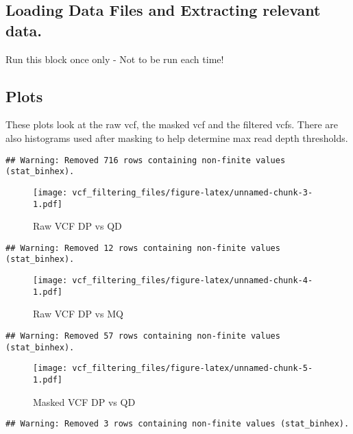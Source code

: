 \documentclass[
]{article}
\begin{document}
\hypertarget{loading-data-files-and-extracting-relevant-data.}{%
\subsection{Loading Data Files and Extracting relevant
data.}\label{loading-data-files-and-extracting-relevant-data.}}

Run this block once only - Not to be run each time!

\hypertarget{plots}{%
\subsection{Plots}\label{plots}}

These plots look at the raw vcf, the masked vcf and the filtered vcfs.
There are also histograms used after masking to help determine max read
depth thresholds.

\begin{verbatim}
## Warning: Removed 716 rows containing non-finite values (stat_binhex).
\end{verbatim}

\begin{figure}
\centering
\texttt{[image: vcf\_filtering\_files/figure-latex/unnamed-chunk-3-1.pdf]}
\caption{Raw VCF DP vs QD}
\end{figure}

\begin{verbatim}
## Warning: Removed 12 rows containing non-finite values (stat_binhex).
\end{verbatim}

\begin{figure}
\centering
\texttt{[image: vcf\_filtering\_files/figure-latex/unnamed-chunk-4-1.pdf]}
\caption{Raw VCF DP vs MQ}
\end{figure}

\begin{verbatim}
## Warning: Removed 57 rows containing non-finite values (stat_binhex).
\end{verbatim}

\begin{figure}
\centering
\texttt{[image: vcf\_filtering\_files/figure-latex/unnamed-chunk-5-1.pdf]}
\caption{Masked VCF DP vs QD}
\end{figure}

\begin{verbatim}
## Warning: Removed 3 rows containing non-finite values (stat_binhex).
\end{verbatim}
\end{document}
